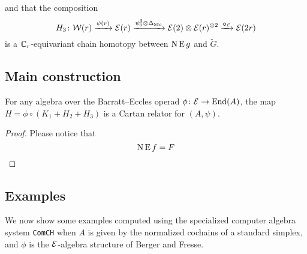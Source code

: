 and that the composition
\[
H_3 \colon \mathcal{W}(r) \xrightarrow{\psi(r)} \mathcal{E}(r) \xrightarrow{\psi^2_0 \otimes \Delta_{\operatorname{Shi}}} \mathcal{E}(2) \otimes \mathcal{E}(r)^{\otimes 2} \xrightarrow{\bm{\circ}_{\mathcal{E}}} \mathcal{E}(2r)
\]
is a $\mathbb{C}_r$-equivariant chain homotopy between $\operatorname{N}\operatorname{E} g$ and $\widetilde G$.


\subsection{Main construction}

\begin{theorem}
	For any algebra over the Barratt--Eccles operad $\phi \colon \mathcal{E} \to \mathrm{End}(A)$, the map $H = \phi \circ (K_1 + H_2 + H_3)$ is a Cartan relator for $(A,\psi)$.
\end{theorem}

\begin{proof}

	Please notice that
	\[
	\operatorname{N}\operatorname{E} f = F
	\]
\end{proof}

\subsection{Examples}

We now show some examples computed using the specialized computer algebra system \texttt{ComCH} \cite{medina2021comch} when $A$ is given by the normalized cochains of a standard simplex, and $\phi$ is the $\mathcal{E}$-algebra structure of Berger and Fresse.
